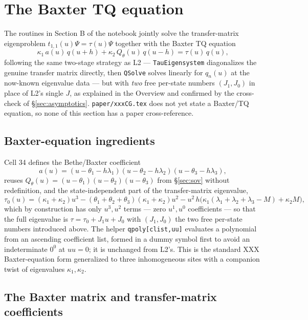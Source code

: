 \documentclass[11pt]{article}
\newcommand{\qth}{Q_\theta}
\begin{document}
\section{The Baxter TQ equation}
\label{sec:baxter}

The routines in Section B of the notebook jointly solve the transfer-matrix eigenproblem
$t_{1,1}(u)\Psi=\tau(u)\Psi$ together with the Baxter TQ equation
\begin{equation}
  \kappa_1\,a(u)\,q(u+h) + \kappa_2\,\qth(u)\,q(u-h) = \tau(u)\,q(u),
  \label{eq:TQ}
\end{equation}
following the same two-stage strategy as L2 --- \texttt{TauEigensystem} diagonalizes the genuine
transfer matrix directly, then \texttt{QSolve} solves linearly for $q_n(u)$ at the now-known
eigenvalue data --- but with \emph{two} free per-state numbers $(J_1,J_0)$ in place of L2's single
$J$, as explained in the Overview and confirmed by the cross-check of \S\ref{sec:asymptotics}.
\texttt{paper/xxxCG.tex} does not yet state a Baxter/TQ equation, so none of this section has a paper
cross-reference.

\subsection*{Baxter-equation ingredients}

Cell 34 defines the Bethe/Baxter coefficient
\[
  a(u) = (u-\theta_1-h\lambda_1)(u-\theta_2-h\lambda_2)(u-\theta_3-h\lambda_3),
\]
reuses $\qth(u)=(u-\theta_1)(u-\theta_2)(u-\theta_3)$ from \S\ref{sec:sov} without redefinition, and
the state-independent part of the transfer-matrix eigenvalue,
\[
  \tau_0(u) = (\kappa_1+\kappa_2)u^3 - (\theta_1+\theta_2+\theta_3)(\kappa_1+\kappa_2)u^2
    - u^2\,h\bigl(\kappa_1(\lambda_1+\lambda_2+\lambda_3-M)+\kappa_2 M\bigr),
\]
which by construction has only $u^3,u^2$ terms --- zero $u^1,u^0$ coefficients --- so that the full
eigenvalue is $\tau=\tau_0+J_1u+J_0$ with $(J_1,J_0)$ the two free per-state numbers introduced above.
The helper \texttt{qpoly[clist,uu]} evaluates a polynomial from an ascending coefficient list, formed
in a dummy symbol first to avoid an indeterminate $0^0$ at $uu=0$; it is unchanged from L2's. This is
the standard XXX Baxter-equation form generalized to three inhomogeneous sites with a companion twist
of eigenvalues $\kappa_1,\kappa_2$.

\subsection*{The Baxter matrix and transfer-matrix coefficients}
\end{document}
